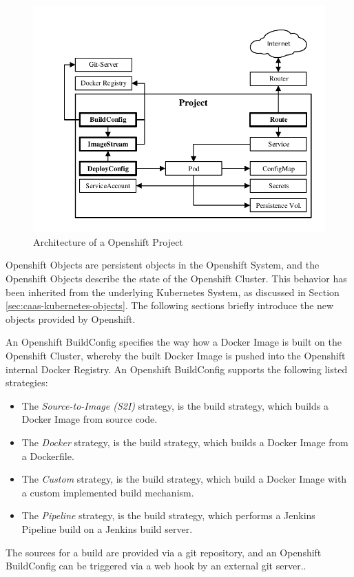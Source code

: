 \begin{figure}[htbp]
	\centering
	\includegraphics[scale=1]{images/openshift-project-architecture.pdf}
	\caption{Architecture of a Openshift Project}
	\label{fig:paas-openshift-project-architecture}
\end{figure} 

Openshift Objects are persistent objects in the Openshift System, and the Openshift Objects describe the state of the Openshift Cluster. This behavior has been inherited from the underlying Kubernetes System, as discussed in Section \vref{sec:caas-kubernetes-objects}. The following sections briefly introduce the new objects provided by Openshift. 

An Openshift BuildConfig specifies the way how a Docker Image is built on the Openshift Cluster, whereby the built Docker Image is pushed into the Openshift internal Docker Registry. An Openshift BuildConfig supports the following listed strategies:
\begin{itemize}
	\item The \emph{Source-to-Image (S2I)} strategy, is the build strategy, which builds a Docker Image from source code.
	\item The \emph{Docker} strategy, is the build strategy, which builds a Docker Image from a Dockerfile.
	\item The \emph{Custom} strategy, is the build strategy, which build a Docker Image with a custom implemented build mechanism.
	\item The \emph{Pipeline} strategy, is the build strategy, which performs a Jenkins Pipeline build on a Jenkins build server.
\end{itemize}
The sources for a build are provided via a git repository, and an Openshift BuildConfig can be triggered via a web hook by an external git server.\cite{S2I2018, OpenshiftBuildStrategies2018}. 

